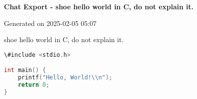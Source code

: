 \documentclass{article}
\begin{document}
\begin{center}
\Large\textbf{Chat Export - shoe hello world in C, do not explain it.}

\normalsize Generated on 2025-02-05 05:07
\end{center}
\bigskip


shoe hello world in C, do not explain it.

\bigskip




\begin{lstlisting}[language=c]
\#include <stdio.h>

int main() {
    printf("Hello, World!\\n");
    return 0;
}

\end{lstlisting}


\bigskip
\end{document}
